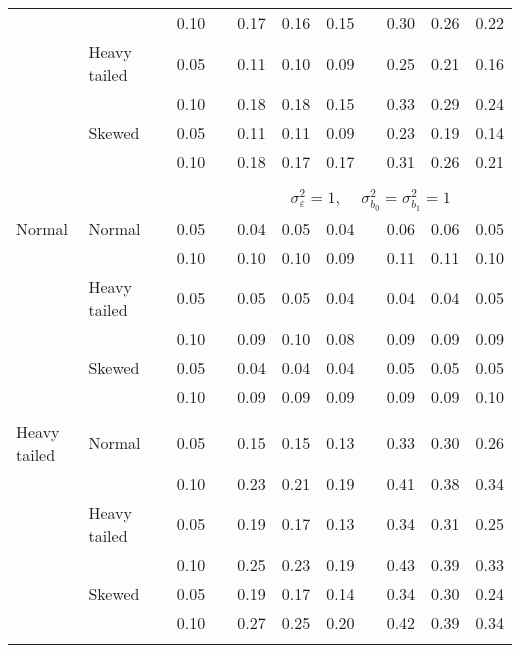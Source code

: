 \begin{table}[ht]
\begin{scriptsize}
\begin{tabular}{ll p{.1cm} c p{.1cm} rrr p{.1cm} rrr}
             &              && 0.10 &&  0.17 & 0.16 & 0.15 && 0.30 & 0.26 & 0.22 \\ 
             & Heavy tailed && 0.05 &&  0.11 & 0.10 & 0.09 && 0.25 & 0.21 & 0.16 \\ 
             &              && 0.10 &&  0.18 & 0.18 & 0.15 && 0.33 & 0.29 & 0.24 \\ 
             & Skewed       && 0.05 &&  0.11 & 0.11 & 0.09 && 0.23 & 0.19 & 0.14 \\ 
             &              && 0.10 &&  0.18 & 0.17 & 0.17 && 0.31 & 0.26 & 0.21 \\ 

&&&&&&&&&&&\\
& && && \multicolumn{7}{c}{$\sigma_{\varepsilon}^2 = 1$, \ \ $\sigma_{b_0}^2 = \sigma_{b_1}^2 = 1$} \\ \cline{6-12}
\rowcolor{gray!20}Normal       & Normal       && 0.05 &&  0.04 & 0.05 & 0.04 && 0.06 & 0.06 & 0.05 \\ 
\rowcolor{gray!20}             &              && 0.10 &&  0.10 & 0.10 & 0.09 && 0.11 & 0.11 & 0.10 \\ 
\rowcolor{gray!20}             & Heavy tailed && 0.05 &&  0.05 & 0.05 & 0.04 && 0.04 & 0.04 & 0.05 \\ 
\rowcolor{gray!20}             &              && 0.10 &&  0.09 & 0.10 & 0.08 && 0.09 & 0.09 & 0.09 \\ 
\rowcolor{gray!20}             & Skewed       && 0.05 &&  0.04 & 0.04 & 0.04 && 0.05 & 0.05 & 0.05 \\ 
\rowcolor{gray!20}             &              && 0.10 &&  0.09 & 0.09 & 0.09 && 0.09 & 0.09 & 0.10 \\ 
             &&&&&&&&&&&\\
Heavy tailed & Normal       && 0.05 &&  0.15 & 0.15 & 0.13 && 0.33 & 0.30 & 0.26 \\ 
             &              && 0.10 &&  0.23 & 0.21 & 0.19 && 0.41 & 0.38 & 0.34 \\ 
             & Heavy tailed && 0.05 &&  0.19 & 0.17 & 0.13 && 0.34 & 0.31 & 0.25 \\ 
             &              && 0.10 &&  0.25 & 0.23 & 0.19 && 0.43 & 0.39 & 0.33 \\ 
             & Skewed       && 0.05 &&  0.19 & 0.17 & 0.14 && 0.34 & 0.30 & 0.24 \\ 
             &              && 0.10 &&  0.27 & 0.25 & 0.20 && 0.42 & 0.39 & 0.34 \\ 
             &&&&&&&&&&&\\

\end{tabular}
\end{scriptsize}
\end{table}
